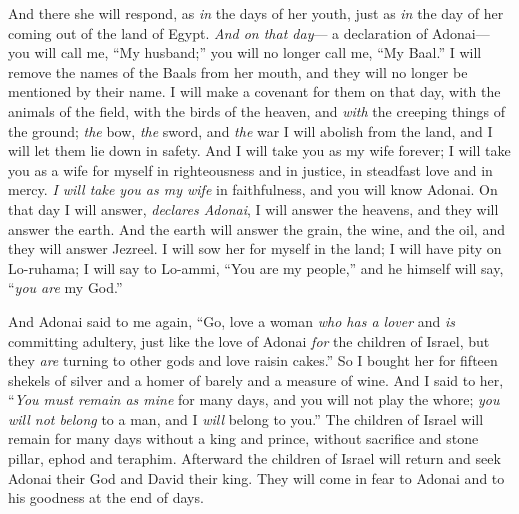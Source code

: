 \begin{biblechapter}
And there she will respond, 
as \textit{in} the days of her youth, 
just as \textit{in} the day of her coming out of 
the land of Egypt.
\verse \textit{And on that day}— 
a declaration of Adonai— 
you will call me, “My husband;” 
you will no longer call me, “My Baal.”
\verse I will remove the names 
of the Baals from her mouth, 
and they will no longer be mentioned by their name.
\verse I will make a covenant for them on that day, 
with the animals of the field, 
with the birds of the heaven, and 
\textit{with} the creeping things of the ground; 
\textit{the} bow, \textit{the} sword, and \textit{the} war I will abolish from the land, and I will let them lie down in safety.
\verse And I will take you as my wife forever; 
I will take you as a wife for myself in righteousness and in justice, 
in steadfast love and in mercy.
\verse \textit{I will take you as my wife} in faithfulness, 
and you will know Adonai.
\verse On that day I will answer, \textit{declares Adonai}, 
I will answer the heavens, 
and they will answer the earth.
\verse And the earth will answer 
the grain, the wine, and the oil, 
and they will answer Jezreel.
\verse I will sow her for myself in the land; 
I will have pity on Lo-ruhama; 
I will say to Lo-ammi, 
“You are my people,” 
and he himself will say, “\textit{you are} my God.”
\end{biblechapter}

\begin{biblechapter} %
 And Adonai said to me again, 
“Go, love a woman 
\textit{who has a lover} and \textit{is} committing adultery, 
just like the love of Adonai \textit{for} the children of Israel, 
but they \textit{are} turning to other gods 
and love raisin cakes.”
\verse So I bought her for fifteen shekels of silver 
and a homer of barely and a measure of wine.
\verse And I said to her, 
“\textit{You must remain as mine} for many days, 
and you will not play the whore; 
\textit{you will not belong} to a man, 
and I \textit{will} belong to you.”
\verse The children of Israel will remain for many days 
without a king and prince, 
without sacrifice and stone pillar, ephod and teraphim.
\verse Afterward the children of Israel will return 
and seek Adonai their God and David their king. 
They will come in fear to Adonai 
and to his goodness at the end of days.
\end{biblechapter}

